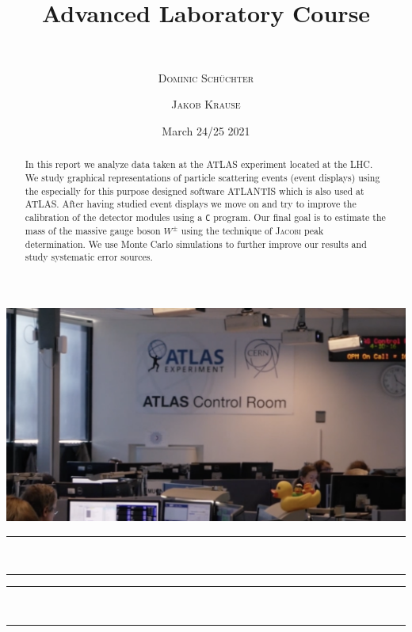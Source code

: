 \documentclass[11pt,a4paper,notitlepage]{scrartcl}
\title{ Advanced Laboratory Course}
\subtitle{\name  \\ \hrulefill}
\date{March 24/25 2021 \\ }
\author[*]{\textsc{Dominic Schüchter}}
\author[$\dagger$]{\textsc{Jakob Krause}}
\affil[*]{\href{mailto:dschuechter@uni-bonn.de}{\faEnvelope  \hspace*{0.1cm}dschuechter@uni-bonn.de} {\color{black}$|$} \href{https://github.com/dschuechter}{\faGithub  \hspace*{0.1cm}dschuechter}}
\affil[$\dagger$]{\href{mailto:krause.jakob@uni-bonn.de}{\faEnvelope  \hspace*{0.1cm}krause.jakob@uni-bonn.de} {\color{black}$|$} \href{https://github.com/krausejm}{\faGithub  \hspace*{0.1cm}krausejm}}
\begin{document}
\maketitle
\vspace{-.8cm}
\thispagestyle{empty}
\begin{center}
\includegraphics[width=\linewidth]{P1_pics/Titelbild.png}
\vspace{-.2cm}

\rule{12cm}{1pt} \\\vspace{-.6cm} \rule{10cm}{1pt}
\end{center}



\begin{abstract}
	In this report we analyze data taken at the ATLAS experiment located at the LHC. We study graphical representations of particle scattering events (event displays) using the especially for this purpose designed software ATLANTIS which is also used at ATLAS. After having studied event displays we move on and try to improve the calibration of the detector modules using a \texttt{C} program. Our final goal is to estimate the mass of the massive gauge boson $W^\pm$ using the technique of \textsc{Jacobi} peak determination. We use Monte Carlo simulations to further improve our results and study systematic error sources.
\end{abstract}
\begin{center}
	\rule{10cm}{1pt} \\\vspace{-.6cm} \rule{12cm}{1pt}
\end{center}

\setcounter{page}{-1}
\newpage

\tableofcontents
\thispagestyle{empty}
\newpage
\end{document}
